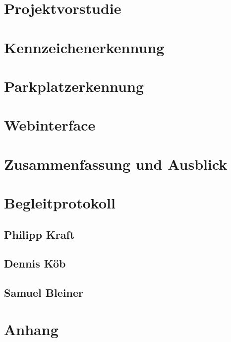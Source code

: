 \documentclass[12pt]{article}
\begin{document}
\section{Projektvorstudie}

\pagebreak

\section{Kennzeichenerkennung}

\pagebreak

\section{Parkplatzerkennung}

\pagebreak

\section{Webinterface}

\pagebreak

\section{Zusammenfassung und Ausblick}

\pagebreak

\section{Begleitprotokoll}

\pagebreak

\subsection{Philipp Kraft}

\pagebreak

\subsection{Dennis Köb}

\pagebreak

\subsection{Samuel Bleiner}

\pagebreak

\section{Anhang}

\pagebreak
\end{document}
